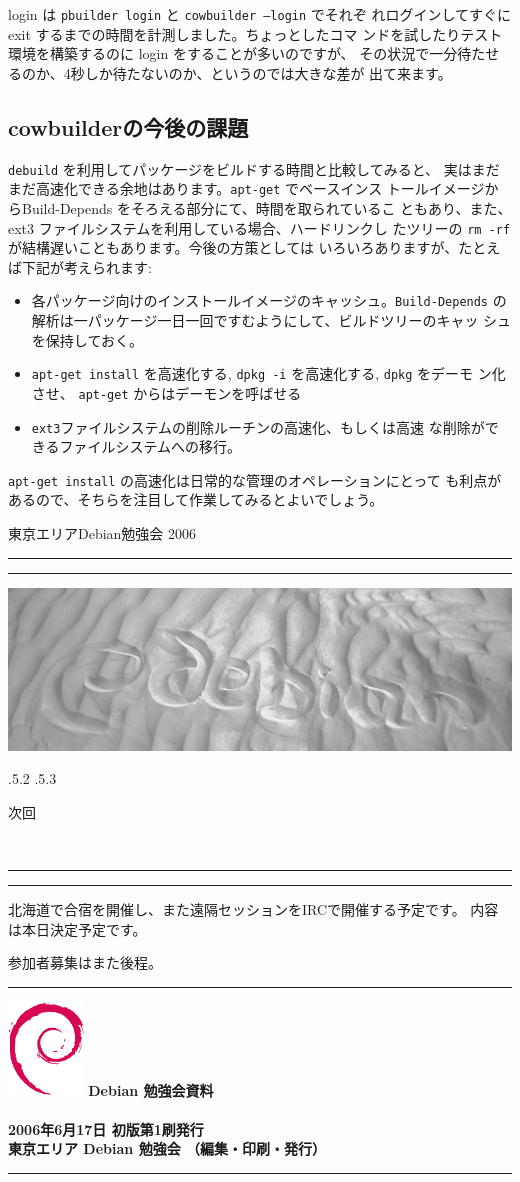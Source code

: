 \documentclass[mingoth,a4paper]{jsarticle}
\makeatletter
\renewcommand{\section}{\@startsection{section}{1}{\z@}%
    {\Cvs \@plus.5\Cdp \@minus.2\Cdp}%
    {.5\Cvs \@plus.3\Cdp}%
    {\normalfont\Huge\headfont\raggedright\centering}} %
\newcommand{\dancersection}[2]{%
\newpage
東京エリアDebian勉強会 2006
\hrule
\vspace{0.5mm}
\hrule
\hfill{}\includegraphics[width=16cm]{image2006-natsu/guruguru-sand-light.png}\\
\vspace{-5cm}
\begin{center}
\section{#1}
\end{center}
\hfill{}\colorbox{white}{#2}\hspace{3cm}\space\\
\vspace{1cm}
\hrule
\vspace{0.5mm}
\hrule
\vspace{1cm}
}
\makeatother
\begin{document}
login は \texttt{pbuilder login} と \texttt{cowbuilder --login} でそれぞ
れログインしてすぐに exit するまでの時間を計測しました。ちょっとしたコマ
ンドを試したりテスト環境を構築するのに login をすることが多いのですが、
その状況で一分待たせるのか、4秒しか待たないのか、というのでは大きな差が
出て来ます。

\subsection{cowbuilderの今後の課題}

\texttt{debuild} を利用してパッケージをビルドする時間と比較してみると、
実はまだまだ高速化できる余地はあります。\texttt{apt-get} でベースインス
トールイメージからBuild-Depends をそろえる部分にて、時間を取られているこ
ともあり、また、ext3 ファイルシステムを利用している場合、ハードリンクし
たツリーの \texttt{rm -rf} が結構遅いこともあります。今後の方策としては
いろいろありますが、たとえば下記が考えられます:

\begin{itemize}
 \item 各パッケージ向けのインストールイメージのキャッシュ。\texttt{Build-Depends} 
       の解析は一パッケージ一日一回ですむようにして、ビルドツリーのキャッ
       シュを保持しておく。
 \item \texttt{apt-get install} を高速化する, \texttt{dpkg -i} を高速化する, \texttt{dpkg} をデーモ
       ン化させ、 \texttt{apt-get} からはデーモンを呼ばせる
 \item \texttt{ext3}ファイルシステムの削除ルーチンの高速化、もしくは高速
       な削除ができるファイルシステムへの移行。
\end{itemize}

\texttt{apt-get install} の高速化は日常的な管理のオペレーションにとって
も利点があるので、そちらを注目して作業してみるとよいでしょう。

\dancersection{次回}{}

北海道で合宿を開催し、また遠隔セッションをIRCで開催する予定です。
内容は本日決定予定です。

参加者募集はまた後程。

\newpage

\vspace*{15cm}
\hrule
\vspace{2mm}
\includegraphics[width=2cm]{image200502/openlogo-nd.eps}
\noindent \Large \bf Debian 勉強会資料\\ \\
\noindent \normalfont 2006年6月17日 \hspace{5mm}  初版第1刷発行\\
\noindent \normalfont 東京エリア Debian 勉強会 （編集・印刷・発行）\\
\hrule
\end{document}
